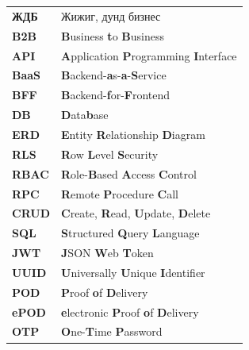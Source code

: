 

\section*{\abbrevname}

\vspace{1cm}

\begin{center}
\begin{tabular}{ll}
\textbf{ЖДБ} & Жижиг, дунд бизнес \\
\textbf{B2B} & \textbf{B}usiness \textbf{t}o \textbf{B}usiness \\
\textbf{API} & \textbf{A}pplication \textbf{P}rogramming \textbf{I}nterface \\
\textbf{BaaS} & \textbf{B}ackend-\textbf{a}s-\textbf{a}-\textbf{S}ervice \\
\textbf{BFF} & \textbf{B}ackend-\textbf{f}or-\textbf{F}rontend \\
\textbf{DB} & \textbf{D}ata\textbf{b}ase \\
\textbf{ERD} & \textbf{E}ntity \textbf{R}elationship \textbf{D}iagram \\
\textbf{RLS} & \textbf{R}ow \textbf{L}evel \textbf{S}ecurity \\
\textbf{RBAC} & \textbf{R}ole-\textbf{B}ased \textbf{A}ccess \textbf{C}ontrol \\
\textbf{RPC} & \textbf{R}emote \textbf{P}rocedure \textbf{C}all \\
\textbf{CRUD} & \textbf{C}reate, \textbf{R}ead, \textbf{U}pdate, \textbf{D}elete \\
\textbf{SQL} & \textbf{S}tructured \textbf{Q}uery \textbf{L}anguage \\
\textbf{JWT} & \textbf{J}SON \textbf{W}eb \textbf{T}oken \\
\textbf{UUID} & \textbf{U}niversally \textbf{U}nique \textbf{I}dentifier \\
\textbf{POD} & \textbf{P}roof \textbf{o}f \textbf{D}elivery \\
\textbf{ePOD} & \textbf{e}lectronic \textbf{P}roof \textbf{o}f \textbf{D}elivery \\
\textbf{OTP} & \textbf{O}ne-\textbf{T}ime \textbf{P}assword \\

\end{tabular}
\end{center}

